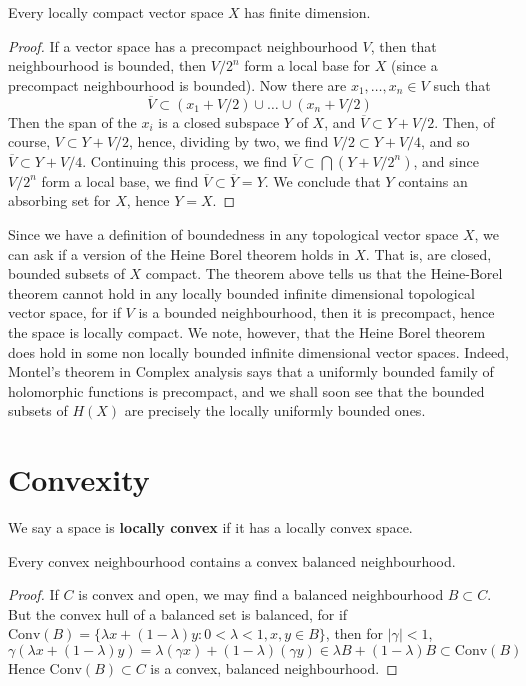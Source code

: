 \begin{theorem}
    Every locally compact vector space $X$ has finite dimension.
\end{theorem}
\begin{proof}
    If a vector space has a precompact neighbourhood $V$, then that neighbourhood is bounded, then $V/2^n$ form a local base for $X$ (since a precompact neighbourhood is bounded). Now there are $x_1, \dots, x_n \in V$ such that
    \[ \overline{V} \subset (x_1 + V/2) \cup \dots \cup (x_n + V/2) \]
    Then the span of the $x_i$ is a closed subspace $Y$ of $X$, and $\overline{V} \subset Y + V/2$. Then, of course, $V \subset Y + V/2$, hence, dividing by two, we find $V/2 \subset Y + V/4$, and so $\overline{V} \subset Y + V/4$. Continuing this process, we find $\overline{V} \subset \bigcap (Y + V/2^n)$, and since $V/2^n$ form a local base, we find $\overline{V} \subset \overline{Y} = Y$. We conclude that $Y$ contains an absorbing set for $X$, hence $Y = X$.
\end{proof}

Since we have a definition of boundedness in any topological vector space $X$, we can ask if a version of the Heine Borel theorem holds in $X$. That is, are closed, bounded subsets of $X$ compact. The theorem above tells us that the Heine-Borel theorem cannot hold in any locally bounded infinite dimensional topological vector space, for if $V$ is a bounded neighbourhood, then it is precompact, hence the space is locally compact. We note, however, that the Heine Borel theorem does hold in some non locally bounded infinite dimensional vector spaces. Indeed, Montel's theorem in Complex analysis says that a uniformly bounded family of holomorphic functions is precompact, and we shall soon see that the bounded subsets of $H(X)$ are precisely the locally uniformly bounded ones.




\section{Convexity}

We say a space is {\bf locally convex} if it has a locally convex space.

\begin{theorem}
    Every convex neighbourhood contains a convex balanced neighbourhood.
\end{theorem}
\begin{proof}
    If $C$ is convex and open, we may find a balanced neighbourhood $B \subset C$. But the convex hull of a balanced set is balanced, for if $\text{Conv}(B) = \{ \lambda x + (1 - \lambda) y : 0 < \lambda < 1, x,y \in B \}$, then for $|\gamma| < 1$,
    \[ \gamma (\lambda x + (1 - \lambda) y) = \lambda (\gamma x) + (1 - \lambda) (\gamma y) \in \lambda B + (1 - \lambda) B \subset \text{Conv}(B) \]
    Hence $\text{Conv}(B) \subset C$ is a convex, balanced neighbourhood.
\end{proof}

